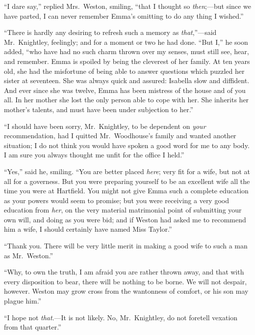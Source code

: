 ``I dare say,'' replied Mrs.\ Weston, smiling, ``that I thought
so \emph{then};---but since we have parted, I can never remember Emma's
omitting to do any thing I wished.''

``There is hardly any desiring to refresh such a memory as \emph{that},''---said
Mr.\ Knightley, feelingly; and for a moment or two he had done.  ``But I,''
he soon added, ``who have had no such charm thrown over my senses,
must still see, hear, and remember.  Emma is spoiled by being the
cleverest of her family.  At ten years old, she had the misfortune of
being able to answer questions which puzzled her sister at seventeen.
She was always quick and assured: Isabella slow and diffident.
And ever since she was twelve, Emma has been mistress of the house
and of you all.  In her mother she lost the only person able to cope
with her.  She inherits her mother's talents, and must have been
under subjection to her.''

``I should have been sorry, Mr.\ Knightley, to be dependent on
\emph{your} recommendation, had I quitted Mr.\ Woodhouse's family and wanted
another situation; I do not think you would have spoken a good word for
me to any body.  I am sure you always thought me unfit for the office I held.''

``Yes,'' said he, smiling.  ``You are better placed \emph{here}; very fit
for a wife, but not at all for a governess.  But you were preparing
yourself to be an excellent wife all the time you were at Hartfield.
You might not give Emma such a complete education as your powers would
seem to promise; but you were receiving a very good education from \emph{her},
on the very material matrimonial point of submitting your own will,
and doing as you were bid; and if Weston had asked me to recommend
him a wife, I should certainly have named Miss Taylor.''

``Thank you.  There will be very little merit in making a good wife
to such a man as Mr.\ Weston.''

``Why, to own the truth, I am afraid you are rather thrown away,
and that with every disposition to bear, there will be nothing
to be borne.  We will not despair, however.  Weston may grow cross
from the wantonness of comfort, or his son may plague him.''

``I hope not \emph{that}.---It is not likely.  No, Mr.\ Knightley, do not
foretell vexation from that quarter.''

